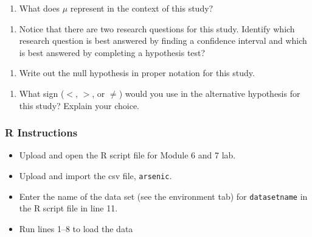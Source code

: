 \documentclass[
]{report}
\providecommand{\tightlist}{%
  \setlength{\itemsep}{0pt}\setlength{\parskip}{0pt}}
\begin{document}
\vspace{2mm}

\begin{enumerate}
\def\labelenumi{\arabic{enumi}.}
\tightlist
\item
  What does \(\mu\) represent in the context of this study?
\end{enumerate}

\vspace{0.8in}

\begin{enumerate}
\def\labelenumi{\arabic{enumi}.}
\setcounter{enumi}{1}
\tightlist
\item
  Notice that there are two research questions for this study. Identify which research question is best answered by finding a confidence interval and which is best answered by completing a hypothesis test?
\end{enumerate}

\vspace{0.5in}

\begin{enumerate}
\def\labelenumi{\arabic{enumi}.}
\setcounter{enumi}{2}
\tightlist
\item
  Write out the null hypothesis in proper notation for this study.
\end{enumerate}

\vspace{0.4in}

\begin{enumerate}
\def\labelenumi{\arabic{enumi}.}
\setcounter{enumi}{3}
\tightlist
\item
  What sign (\(<\), \(>\), or \(\neq\)) would you use in the alternative hypothesis for this study? Explain your choice.
\end{enumerate}

\vspace{0.5in}

\subsubsection*{R Instructions}\label{r-instructions-6}

\begin{itemize}
\item
  Upload and open the R script file for Module 6 and 7 lab.
\item
  Upload and import the csv file, \texttt{arsenic}.
\item
  Enter the name of the data set (see the environment tab) for \texttt{datasetname} in the R script file in line 11.
\item
  Run lines 1--8 to load the data
\end{itemize}
\end{document}
